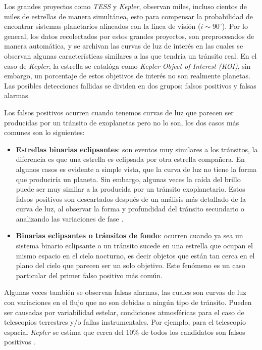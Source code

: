 Los grandes proyectos como \textit{TESS} y \textit{Kepler}, observan miles, incluso cientos de miles de estrellas de manera simultánea, esto para compensar la probabilidad de encontrar sistemas planetarios alineados con la linea de visión ($i\sim 90^{\circ}$). Por lo general, los datos recolectados por estos grandes proyectos, son preprocesados de manera automática, y se archivan las curvas de luz de interés en las cuales se observan algunas características similares a las que tendría un tránsito real. En el caso de \textit{Kepler}, la estrella se catalóga como \textit{Kepler Object of Interest (KOI)}, sin embargo, un porcentaje de estos objetivos de interés no son realmente planetas. Las posibles detecciones fallidas se dividen en dos grupos: falsos positivos y falsas alarmas.

Los falsos positivos ocurren cuando tenemos curvas de luz que parecen ser producidas por un tránsito de exoplanetas pero no lo son, los dos casos más comunes son lo siguientes:

\begin{itemize}
\item \textbf{Estrellas binarias eclipsantes}: son eventos muy similares a los tránsitos, la diferencia es que una estrella es eclipsada por otra estrella compañera. En algunos casos es evidente a simple vista, que la curva de luz no tiene la forma que produciría un planeta. Sin embargo, algunas veces la caída del brillo puede ser muy similar a la producida por un tránsito exoplanetario. Estos falsos positivos son descartados después de un análisis más detallado de la curva de luz, al observar la forma y profundidad del tránsito secundario o analizando las variaciones de fase \cite{bryson2017kepler}.
\item \textbf{Binarias eclipsantes o tránsitos de fondo}: ocurren cuando ya sea un sistema binario eclipsante o un tránsito sucede en una estrella que ocupan el mismo espacio en el cielo nocturno, es decir objetos que están tan cerca en el plano del cielo que parecen ser un solo objetivo. Este fenómeno es un caso particular del primer falso positivo más común.
\end{itemize}

Algunas veces también se observan falsas alarmas, las cuales son curvas de luz con variaciones en el flujo que no son debidas a ningún tipo de tránsito. Pueden ser causadas por variabilidad estelar, condiciones atmosféricas para el caso de telescopios terrestres y/o fallas instrumentales. Por ejemplo, para el telescopio espacial \textit{Kepler} se estima que cerca del 10\% de todos los candidatos son falsos positivos \cite{fressin2013false}.


